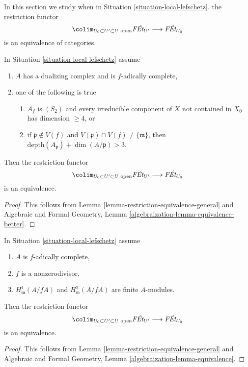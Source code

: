 \noindent
In this section we study when in Situation \ref{situation-local-lefschetz}.
the restriction functor
$$
\colim_{U_0 \subset U' \subset U\text{ open}} \textit{F\'Et}_{U'}
\longrightarrow
\textit{F\'Et}_{U_0}
$$
is an equivalence of categories.

\begin{lemma}
\label{lemma-essentially-surjective-general-better}
In Situation \ref{situation-local-lefschetz} assume
\begin{enumerate}
\item $A$ has a dualizing complex and is $f$-adically complete,
\item one of the following is true
\begin{enumerate}
\item $A_f$ is $(S_2)$ and every irreducible component of $X$
not contained in $X_0$ has dimension $\geq 4$, or
\item if $\mathfrak p \not \in V(f)$ and
$V(\mathfrak p) \cap V(f) \not = \{\mathfrak m\}$, then
$\text{depth}(A_\mathfrak p) + \dim(A/\mathfrak p) > 3$.
\end{enumerate}
\end{enumerate}
Then the restriction functor
$$
\colim_{U_0 \subset U' \subset U\text{ open}} \textit{F\'Et}_{U'}
\longrightarrow
\textit{F\'Et}_{U_0}
$$
is an equivalence.
\end{lemma}

\begin{proof}
This follows from Lemma \ref{lemma-restriction-equivalence-general}
and
Algebraic and Formal Geometry, Lemma
\ref{algebraization-lemma-equivalence-better}.
\end{proof}

\begin{lemma}
\label{lemma-essentially-surjective-general}
In Situation \ref{situation-local-lefschetz} assume
\begin{enumerate}
\item $A$ is $f$-adically complete,
\item $f$ is a nonzerodivisor,
\item $H^1_\mathfrak m(A/fA)$ and $H^2_\mathfrak m(A/fA)$
are finite $A$-modules.
\end{enumerate}
Then the restriction functor
$$
\colim_{U_0 \subset U' \subset U\text{ open}} \textit{F\'Et}_{U'}
\longrightarrow
\textit{F\'Et}_{U_0}
$$
is an equivalence.
\end{lemma}

\begin{proof}
This follows from Lemma \ref{lemma-restriction-equivalence-general}
and
Algebraic and Formal Geometry, Lemma
\ref{algebraization-lemma-equivalence}.
\end{proof}

